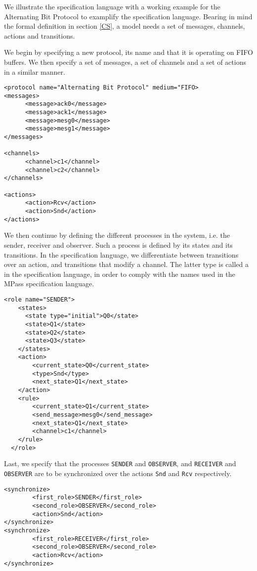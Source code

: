 \begin{exmp}
We illustrate the specification language with a working example for the Alternating Bit Protocol to examplify the specification language. Bearing in mind the formal definition in section \ref{CS}, a model needs a set of messages, channels, actions and transitions.

We begin by specifying a new protocol, its name and that it is operating on FIFO buffers. We then specify a set of messages, a set of channels and a set of actions in a similar manner.

\begin{lstlisting}[frame=single, showstringspaces=false]
<protocol name="Alternating Bit Protocol" medium="FIFO>
<messages>
      <message>ack0</message>
      <message>ack1</message>
      <message>mesg0</message>
      <message>mesg1</message>
</messages>

<channels>
      <channel>c1</channel>
      <channel>c2</channel>
</channels>

<actions>
      <action>Rcv</action>
      <action>Snd</action>
</actions>
\end{lstlisting}

We then continue by defining the different processes in the system, i.e. the sender, receiver and observer. Such a process is defined by its states and its transitions. In the specification language, we differentiate between transitions over an action, and transitions that modify a channel. The latter type is called a  in the specification language, in order to comply with the names used in the MPass specification language.

\begin{lstlisting}[frame=single]
  <role name="SENDER">
    <states>
      <state type="initial">Q0</state>
      <state>Q1</state>
      <state>Q2</state>
      <state>Q3</state>
    </states>
    <action>
        <current_state>Q0</current_state>
        <type>Snd</type>
        <next_state>Q1</next_state>
    </action>
    <rule>
        <current_state>Q1</current_state>
        <send_message>mesg0</send_message>
        <next_state>Q1</next_state>
        <channel>c1</channel>
    </rule>
  </role>
\end{lstlisting}

Last, we specify that the processes \texttt{SENDER} and \texttt{OBSERVER}, and  \texttt{RECEIVER} and \texttt{OBSERVER} are to be synchronized over the actions \texttt{Snd} and \texttt{Rcv} respectively.

\begin{lstlisting}[frame=single]
<synchronize>
        <first_role>SENDER</first_role>
        <second_role>OBSERVER</second_role>
        <action>Snd</action>
</synchronize>
<synchronize>
        <first_role>RECEIVER</first_role>
        <second_role>OBSERVER</second_role>
        <action>Rcv</action>
</synchronize>
\end{lstlisting}
\end{exmp}
